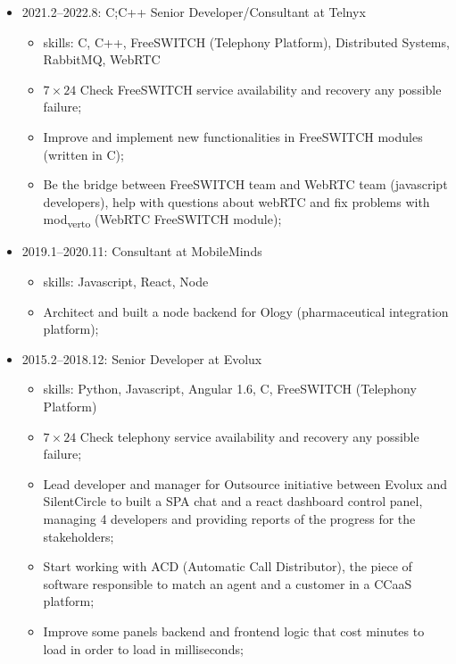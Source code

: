 \documentclass[
]{article}
\providecommand{\tightlist}{%
  \setlength{\itemsep}{0pt}\setlength{\parskip}{0pt}}
\begin{document}
\begin{itemize}
\tightlist
\item
  2021.2--2022.8: C;C++ Senior Developer/Consultant at Telnyx

  \begin{itemize}
  \tightlist
  \item
    skills: C, C++, FreeSWITCH (Telephony Platform), Distributed
    Systems, RabbitMQ, WebRTC
  \item
    \(7 \times 24\) Check FreeSWITCH service availability and recovery
    any possible failure;
  \item
    Improve and implement new functionalities in FreeSWITCH modules
    (written in C);
  \item
    Be the bridge between FreeSWITCH team and WebRTC team (javascript
    developers), help with questions about webRTC and fix problems with
    mod\textsubscript{verto} (WebRTC FreeSWITCH module);
  \end{itemize}
\end{itemize}

\vspace{2mm}

\begin{itemize}
\tightlist
\item
  2019.1--2020.11: Consultant at MobileMinds

  \begin{itemize}
  \tightlist
  \item
    skills: Javascript, React, Node
  \item
    Architect and built a node backend for Ology (pharmaceutical
    integration platform);
  \end{itemize}
\end{itemize}

\vspace{2mm}

\begin{itemize}
\tightlist
\item
  2015.2--2018.12: Senior Developer at Evolux

  \begin{itemize}
  \tightlist
  \item
    skills: Python, Javascript, Angular 1.6, C, FreeSWITCH (Telephony
    Platform)
  \item
    \(7 \times 24\) Check telephony service availability and recovery
    any possible failure;
  \item
    Lead developer and manager for Outsource initiative between Evolux
    and SilentCircle to built a SPA chat and a react dashboard control
    panel, managing 4 developers and providing reports of the progress
    for the stakeholders;
  \item
    Start working with ACD (Automatic Call Distributor), the piece of
    software responsible to match an agent and a customer in a CCaaS
    platform;
  \item
    Improve some panels backend and frontend logic that cost minutes to
    load in order to load in milliseconds;
  \end{itemize}
\end{itemize}
\end{document}
